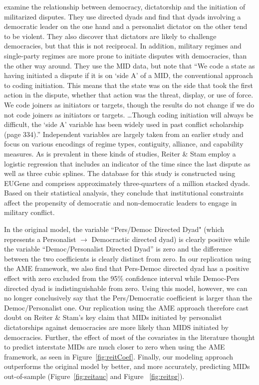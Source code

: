 \citet{reiter:stam:2003} examine the relationship between democracy, dictatorship and the initiation of militarized disputes.  They use directed dyads and find that dyads involving a democratic leader on the one hand and a personalist dictator on the other tend to be violent. They also discover that dictators are likely to challenge democracies, but that this is not reciprocal.  In addition, military regimes and single-party regimes are more prone to initiate disputes with democracies, than the other way around.  They use the MID data, but note that ``We code a state as having initiated a dispute if it is on `side A' of a MID, the conventional approach to coding initiation. This means that the state was on the side that took the first action in the dispute, whether that action was the threat, display, or use of force. We code joiners as initiators or targets, though the results do not change if we do not code joiners as initiators or targets. \ldots Though coding initiation will always be difficult, the `side A' variable has been widely used in past conflict scholarship (page 334).'' Independent variables are largely taken from an earlier study and focus on various encodings of regime types, contiguity, alliance, and capability measures. As is prevalent in these kinds of studies, Reiter \& Stam employ a logistic regression that includes an indicator of the time since the last dispute as well as three cubic splines. The database for this study is constructed using EUGene \citep{bennett:stam:2000} and comprises approximately three-quarters of a million stacked dyads. Based on their statistical analysis, they conclude that institutional constraints affect the propensity of democratic and non-democratic leaders to engage in military conflict. 

In the original model, the variable ``Pers/Democ Directed Dyad" (which represents a Personalist $\rightarrow$ Democractic directed dyad) is clearly positive while the variable ``Democ/Personalist Directed Dyad'' is zero and the difference between the two coefficients is clearly distinct from zero. In our replication using the AME framework, we also find that Pers-Democ directed dyad has a positive effect with zero excluded from the 95\% confidence interval while Democ-Pers directed dyad is indistinguishable from zero. Using this model, however, we can no longer conclusively say that the Pers/Democratic coefficient is larger than the Democ/Personalist one.
Our replication using the AME approach therefore cast doubt on Reiter \& Stam's key claim that MIDs initiated by personalist dictatorships against democracies are more likely than MIDS initiated by democracies. Further, the effect of most of the covariates in the literature thought to predict interstate MIDs are much closer to zero when using the AME framework, as seen in Figure~\ref{fig:reitCoef}. Finally, our modeling approach outperforms the original model by better, and more accurately, predicting MIDs out-of-sample (Figure~\ref{fig:reitauc} and Figure ~\ref{fig:reitpr}).  

